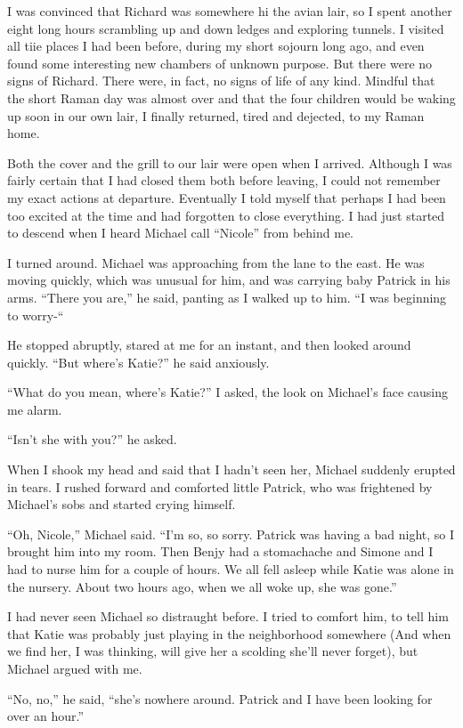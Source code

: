 \documentclass[]{article}
\begin{document}
I was convinced that Richard was somewhere hi the avian lair, so I spent another eight long hours scrambling up and down ledges and exploring tunnels.  I visited all tiie places I had been before, during my short sojourn long ago, and even found some interesting new chambers of unknown purpose.  But there were no signs of Richard.  There were, in fact, no signs of life of any kind.  Mindful that the short Raman day was almost over and that the four children would be waking up soon in our own lair, I finally returned, tired and dejected, to my Raman home.

Both the cover and the grill to our lair were open when I arrived.  Although I was fairly certain that I had closed them both before leaving, I could not remember my exact actions at departure.  Eventually I told myself that perhaps I had been too excited at the time and had forgotten to close everything.  I had just started to descend when I heard Michael call “Nicole” from behind me.

I turned around.  Michael was approaching from the lane to the east.  He was moving quickly, which was unusual for him, and was carrying baby Patrick in his arms.  “There you are,” he said, panting as I walked up to him.  “I was beginning to worry-“

He stopped abruptly, stared at me for an instant, and then looked around quickly.  “But where’s Katie?” he said anxiously.

“What do you mean, where’s Katie?” I asked, the look on Michael’s face causing me alarm.

“Isn’t she with you?” he asked.

When I shook my head and said that I hadn’t seen her, Michael suddenly erupted in tears.  I rushed forward and comforted little Patrick, who was frightened by Michael’s sobs and started crying himself.

“Oh, Nicole,” Michael said.  “I’m so, so sorry.  Patrick was having a bad night, so I brought him into my room.  Then Benjy had a stomachache and Simone and I had to nurse him for a couple of hours.  We all fell asleep while Katie was alone in the nursery.  About two hours ago, when we all woke up, she was gone.”

I had never seen Michael so distraught before.  I tried to comfort him, to tell him that Katie was probably just playing in the neighborhood somewhere (And when we find her, I was thinking, will give her a scolding she’ll never forget), but Michael argued with me.

“No, no,” he said, “she’s nowhere around.  Patrick and I have been looking for over an hour.”
\end{document}
